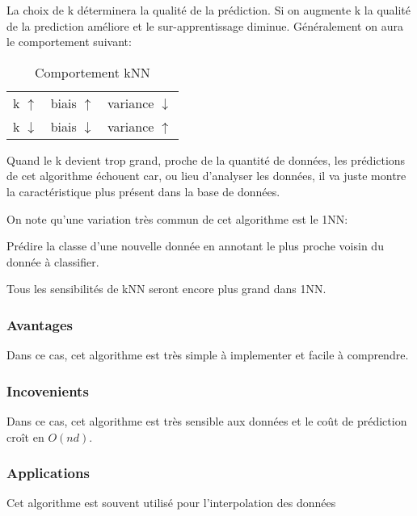 \documentclass{article}
\begin{document}
La choix de k déterminera la qualité de la prédiction. Si on augmente k la qualité de la prediction améliore et le sur-apprentissage diminue. Généralement on aura le comportement suivant:
\begin{table}[H]
    \centering\begin{tabular}{lll}
        k $\uparrow  $ & biais $\uparrow  $ & variance $\downarrow$\\
        k $\downarrow$ & biais $\downarrow$ & variance $\uparrow$\\
    \end{tabular}
    \caption{Comportement kNN}
\end{table}
\begin{remark}
    Quand le k devient trop grand, proche de la quantité de données, les prédictions de cet algorithme échouent car, ou lieu d'analyser les données, il va juste montre la caractéristique plus présent dans la base de données.
\end{remark}
On note qu'une variation très commun de cet algorithme est le 1NN:
\begin{definition}
    Prédire la classe d'une nouvelle donnée en annotant le plus proche voisin du donnée à classifier.    
\end{definition}
\begin{phrase}
    Tous les sensibilités de kNN seront encore plus grand dans 1NN.
\end{phrase}

\subsubsection{Avantages}
Dans ce cas, cet algorithme	est très simple à implementer et facile à comprendre.
\subsubsection{Incovenients}
Dans ce cas, cet algorithme est très sensible aux données et le coût de prédiction croît en $O(nd)$.  
\subsubsection{Applications}
Cet algorithme est souvent utilisé pour l'interpolation des données





\end{document}
